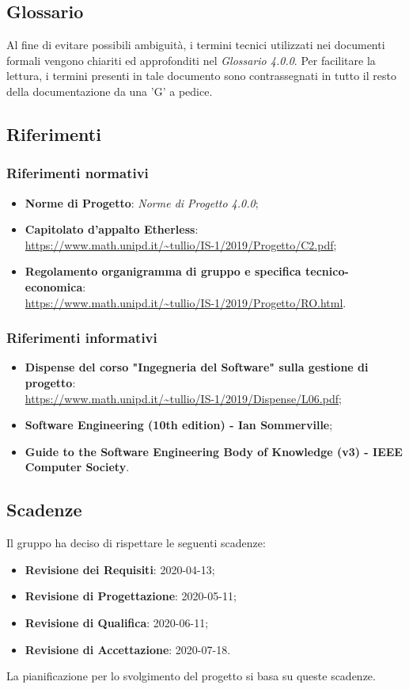\subsection{Glossario}
Al fine di evitare possibili ambiguità, i termini tecnici utilizzati nei documenti formali vengono chiariti ed approfonditi nel \textit{Glossario 4.0.0}. Per facilitare la lettura, i termini presenti in tale documento sono contrassegnati in tutto il resto della documentazione da una 'G' a pedice.
\subsection{Riferimenti}
\subsubsection{Riferimenti normativi}
\begin{itemize}
	\item \textbf{Norme di Progetto}: \textit{Norme di Progetto 4.0.0};
	\item \textbf{Capitolato d'appalto Etherless}:\\\url{https://www.math.unipd.it/~tullio/IS-1/2019/Progetto/C2.pdf};
	\item \textbf{Regolamento organigramma di gruppo e specifica tecnico-economica}:\\\url{https://www.math.unipd.it/~tullio/IS-1/2019/Progetto/RO.html}.
\end{itemize}
\subsubsection{Riferimenti informativi}
\begin{itemize}
	\item \textbf{Dispense del corso "Ingegneria del Software" sulla gestione di progetto}:\\\url{https://www.math.unipd.it/~tullio/IS-1/2019/Dispense/L06.pdf};
	\item \textbf{Software Engineering (10th edition) - Ian Sommerville};
	\item \textbf{Guide to the Software Engineering Body of Knowledge (v3) - IEEE Computer Society}.
\end{itemize}
\subsection{Scadenze}
Il gruppo \Gruppo{} ha deciso di rispettare le seguenti scadenze:
\begin{itemize}
	\item \textbf{Revisione dei Requisiti}: 2020-04-13;
	\item \textbf{Revisione di Progettazione}: 2020-05-11;
	\item \textbf{Revisione di Qualifica}: 2020-06-11;
	\item \textbf{Revisione di Accettazione}: 2020-07-18.
\end{itemize}
La pianificazione per lo svolgimento del progetto si basa su queste scadenze.
